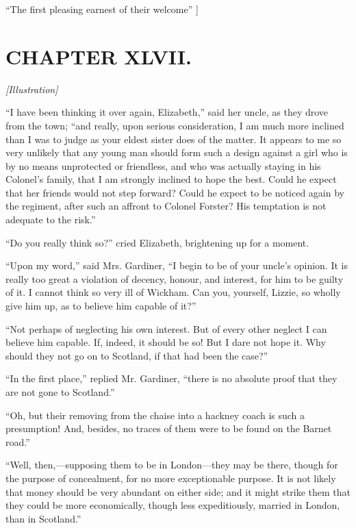 \documentclass[12pt]{book}
\begin{document}
``The first pleasing earnest of their welcome'' ]

\chapter{CHAPTER XLVII.}

\emph{[Illustration]}

``I have been thinking it over again, Elizabeth,'' said her uncle, as they drove from the town; ``and really, upon serious consideration, I am much more inclined than I was to judge as your eldest sister does of the matter. It appears to me so very unlikely that any young man should form such a design against a girl who is by no means unprotected or friendless, and who was actually staying in his Colonel's family, that I am strongly inclined to hope the best. Could he expect that her friends would not step forward? Could he expect to be noticed again by the regiment, after such an affront to Colonel Forster? His temptation is not adequate to the risk.''

``Do you really think so?'' cried Elizabeth, brightening up for a moment.

``Upon my word,'' said Mrs. Gardiner, ``I begin to be of your uncle's opinion. It is really too great a violation of decency, honour, and interest, for him to be guilty of it. I cannot think so very ill of Wickham. Can you, yourself, Lizzie, so wholly give him up, as to believe him capable of it?''

``Not perhaps of neglecting his own interest. But of every other neglect I can believe him capable. If, indeed, it should be so! But I dare not hope it. Why should they not go on to Scotland, if that had been the case?''

``In the first place,'' replied Mr. Gardiner, ``there is no absolute proof that they are not gone to Scotland.''

``Oh, but their removing from the chaise into a hackney coach is such a presumption! And, besides, no traces of them were to be found on the Barnet road.''

``Well, then,---supposing them to be in London---they may be there, though for the purpose of concealment, for no more exceptionable purpose. It is not likely that money should be very abundant on either side; and it might strike them that they could be more economically, though less expeditiously, married in London, than in Scotland.''
\end{document}
